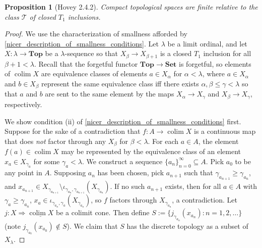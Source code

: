 \documentclass{amsart}
\theoremstyle{plain}
\newtheorem{proposition}[theorem]{Proposition}
\theoremstyle{definition}
\newcommand{\Top}{\mbf{Top}}
\newcommand{\Set}{\mbf{Set}}
\newcommand{\sseq}{\subseteq}
\newcommand{\0}{\mathbf{0}}
\newcommand{\cT}{\mathcal T}
\newcommand{\mbf}[1]{\mathbf{#1}}
\newcommand{\ul}{\underline}
\renewcommand{\(}{\left(}
\renewcommand{\)}{\right)}
\DeclareMathOperator*{\colim}{colim}
\begin{document}
\begin{proposition}[Hovey 2.4.2]\label{2.4.2}
  Compact topological spaces are finite relative to the class $\cT$ of closed $T_1$ inclusions.
\end{proposition}
\begin{proof}
  We use the characterization of smallness afforded by \autoref{nicer_description_of_smallness_conditions}. Let $\lambda$ be a limit ordinal, and let $X:\lambda\to\Top$ be a $\lambda$-sequence so that $X_\beta\to X_{\beta+1}$ is a closed $T_1$ inclusion for all $\beta+1<\lambda$. Recall that the forgetful functor $\Top\to\Set$ is forgetful, so elements of $\colim X$ are equivalence classes of elements $a\in X_\alpha$ for $\alpha<\lambda$, where $a\in X_\alpha$ and $b\in X_\beta$ represent the same equivalence class iff there exists $\alpha,\beta\leq\gamma<\lambda$ so that $a$ and $b$ are sent to the same element by the maps $X_\alpha\to X_\gamma$ and $X_\beta\to X_\gamma$, respectively.

  We show condition (ii) of \autoref{nicer_description_of_smallness_conditions} first. Suppose for the sake of a contradiction that $f:A\to\colim X$ is a continuous map that does \textit{not} factor through any $X_\beta$ for $\beta<\lambda$. For each $a\in A$, the element $f(a)\in\colim X$ may be represented by the equivalence class of an element $x_a\in X_{\gamma_a}$ for some $\gamma_a<\lambda$. We construct a sequence $\{a_n\}_{n=0}^\infty\sseq A$. Pick $a_0$ to be any point in $A$. Supposing $a_n$ has been chosen, pick $a_{n+1}$ such that $\gamma_{a_{n+1}}\geq\gamma_{a_n}$, and $x_{a_{n+1}}\in X_{\gamma_{a_{n+1}}}\setminus\iota_{\gamma_{a_n},\gamma_{a_{n+1}}}(X_{\gamma_{a_n}})$. If no such $a_{n+1}$ exists, then for all $a\in A$ with $\gamma_a\geq\gamma_{a_n}$, $x_a\in\iota_{\gamma_{a_n},\gamma_a}(X_{\gamma_{a_n}})$, so $f$ factors through $X_{\gamma_{a_n}}$, a contradiction. 
  Let $j:X\Rightarrow\ul{\colim X}$ be a colimit cone. Then define $S:=\{j_{\gamma_{a_n}}(x_{a_n}):n=1,2,\ldots\}$ (note $j_{\gamma_{a_0}}(x_{a_0})\notin S$). We claim that $S$ has the discrete topology as a subset of $X_\lambda$. 
\end{proof}
\end{document}
